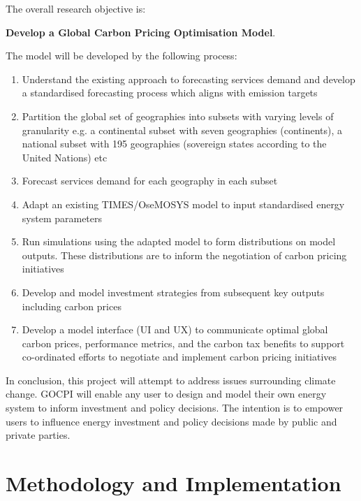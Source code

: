 \documentclass[12pt]{article}
\begin{document}
The overall research objective is: 
\begin{center}
\textbf{Develop a Global Carbon Pricing Optimisation Model}.
\end{center}

The model will be developed by the following process:

\begin{enumerate}
	\item Understand the existing approach to forecasting services demand and develop a standardised forecasting process which aligns with emission targets
	\item Partition the global set of geographies into subsets with varying levels of granularity e.g. a continental subset with seven geographies (continents), a national subset with 195 geographies (sovereign states according to the United Nations) etc
	\item Forecast services demand for each geography in each subset
	\item Adapt an existing TIMES/OseMOSYS model to input standardised energy system parameters 
	\item Run simulations using the adapted model to form distributions on model outputs. These distributions are to inform the negotiation of carbon pricing initiatives
	\item Develop and model investment strategies from subsequent key outputs including carbon prices
	\item Develop a model interface (UI and UX) to communicate optimal global carbon prices, performance metrics, and the carbon tax benefits to support co-ordinated efforts to negotiate and implement carbon pricing initiatives 
\end{enumerate}

In conclusion, this project will attempt to address issues surrounding climate change. 
GOCPI will enable any user to design and model their own energy system to inform investment and policy decisions.
The intention is to empower users to influence energy investment and policy decisions made by public and private parties.

\section{Methodology and Implementation}
\end{document}
